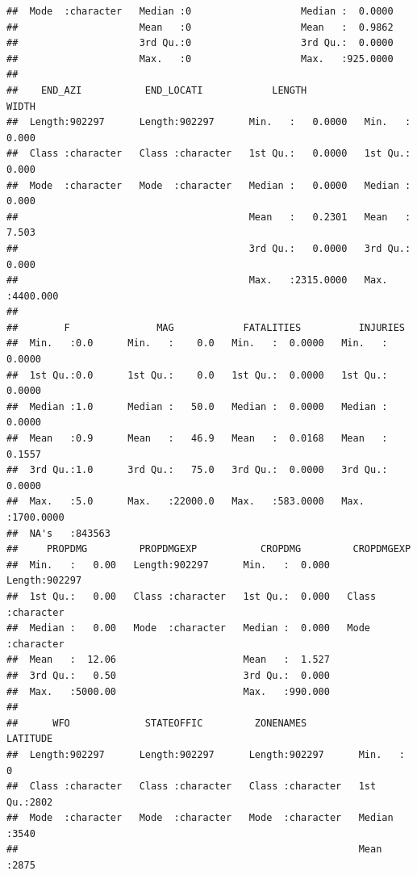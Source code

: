 \documentclass[
]{article}
\begin{document}
\begin{verbatim}
##  Mode  :character   Median :0                   Median :  0.0000  
##                     Mean   :0                   Mean   :  0.9862  
##                     3rd Qu.:0                   3rd Qu.:  0.0000  
##                     Max.   :0                   Max.   :925.0000  
##                                                                   
##    END_AZI           END_LOCATI            LENGTH              WIDTH         
##  Length:902297      Length:902297      Min.   :   0.0000   Min.   :   0.000  
##  Class :character   Class :character   1st Qu.:   0.0000   1st Qu.:   0.000  
##  Mode  :character   Mode  :character   Median :   0.0000   Median :   0.000  
##                                        Mean   :   0.2301   Mean   :   7.503  
##                                        3rd Qu.:   0.0000   3rd Qu.:   0.000  
##                                        Max.   :2315.0000   Max.   :4400.000  
##                                                                              
##        F               MAG            FATALITIES          INJURIES        
##  Min.   :0.0      Min.   :    0.0   Min.   :  0.0000   Min.   :   0.0000  
##  1st Qu.:0.0      1st Qu.:    0.0   1st Qu.:  0.0000   1st Qu.:   0.0000  
##  Median :1.0      Median :   50.0   Median :  0.0000   Median :   0.0000  
##  Mean   :0.9      Mean   :   46.9   Mean   :  0.0168   Mean   :   0.1557  
##  3rd Qu.:1.0      3rd Qu.:   75.0   3rd Qu.:  0.0000   3rd Qu.:   0.0000  
##  Max.   :5.0      Max.   :22000.0   Max.   :583.0000   Max.   :1700.0000  
##  NA's   :843563                                                           
##     PROPDMG         PROPDMGEXP           CROPDMG         CROPDMGEXP       
##  Min.   :   0.00   Length:902297      Min.   :  0.000   Length:902297     
##  1st Qu.:   0.00   Class :character   1st Qu.:  0.000   Class :character  
##  Median :   0.00   Mode  :character   Median :  0.000   Mode  :character  
##  Mean   :  12.06                      Mean   :  1.527                     
##  3rd Qu.:   0.50                      3rd Qu.:  0.000                     
##  Max.   :5000.00                      Max.   :990.000                     
##                                                                           
##      WFO             STATEOFFIC         ZONENAMES            LATITUDE   
##  Length:902297      Length:902297      Length:902297      Min.   :   0  
##  Class :character   Class :character   Class :character   1st Qu.:2802  
##  Mode  :character   Mode  :character   Mode  :character   Median :3540  
##                                                           Mean   :2875  

\end{verbatim}
\end{document}
